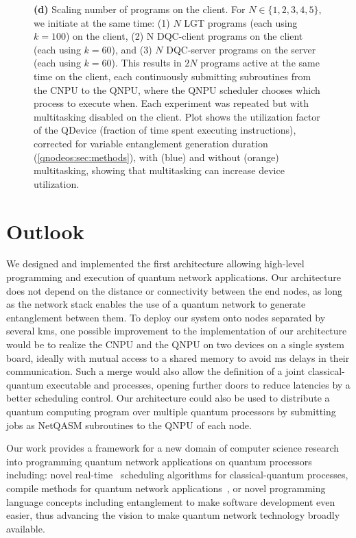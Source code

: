 \begin{figure}[t]
{\textbf{(d)} Scaling number of programs on the client. For $N \in \{1,2,3,4,5\}$, we initiate at the same time: (1) $N$ LGT programs (each using $k=100$) on the client, (2) N DQC-client programs on the client (each using $k=60$), and (3) $N$ DQC-server programs on the server (each using $k=60$). This results in $2N$ programs active at the same time on the client, each continuously submitting subroutines from the CNPU to the QNPU, where the QNPU scheduler chooses which process to execute when. Each experiment was repeated but with multitasking disabled on the client. Plot shows the utilization factor of the QDevice (fraction of time spent executing instructions), corrected for variable entanglement generation duration (\cref{qnodeos:sec:methods}), with (blue) and without (orange) multitasking, showing that multitasking can increase device utilization.}
\label{qnodeos:fig:fig4}
\end{figure}

\section{Outlook}
We designed and implemented the first architecture allowing high-level programming and execution of quantum network applications.
Our architecture does not depend on the distance or connectivity between the end nodes, as long as the network stack enables the use of a quantum network to generate entanglement between them. 
To deploy our system onto nodes separated by several kms, one possible improvement to the implementation of our architecture would be to realize the CNPU and the QNPU on two devices on a single system board, ideally with mutual access to a shared memory to avoid ms delays in their communication.
Such a merge would also allow the definition of a joint classical-quantum executable and processes, opening further doors to reduce latencies by a better scheduling control.
Our architecture could also be used to distribute a quantum computing program over multiple quantum processors by submitting jobs as NetQASM subroutines to the QNPU of each node.

Our work provides a framework for a new domain of computer science research into programming quantum network applications on quantum processors including: novel real-time~\cite{ramamritham_scheduling_1994} scheduling algorithms for classical-quantum processes, compile methods for quantum network applications~\cite{dahlberg_2022_netqasm}, or novel programming language concepts including entanglement to make software development even easier, thus advancing the vision to make quantum network technology broadly available.


